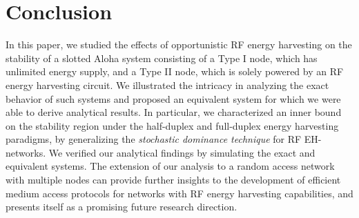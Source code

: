 \documentclass[draftcls,12pt,onecolumn]{IEEEtran}
\begin{document}
\section{Conclusion} \label{sec:conclusions}
In this paper, we studied the effects of opportunistic RF energy harvesting on the stability of a slotted Aloha system consisting of a Type I node, which has unlimited energy supply, and a Type II node, which is solely powered by an RF energy harvesting circuit. We illustrated the intricacy in analyzing the exact behavior of such systems and proposed an equivalent system for which we were able to derive analytical results. In particular, we characterized an inner bound on the stability region under the half-duplex and full-duplex energy harvesting paradigms, by generalizing the \emph{stochastic dominance technique} for RF EH-networks. We verified our analytical findings by simulating the exact and equivalent systems. The extension of our analysis to a random access network with multiple nodes can provide further insights to the development of efficient medium access protocols for networks with RF energy harvesting capabilities, and presents itself as a promising future research direction. 






\end{document}
